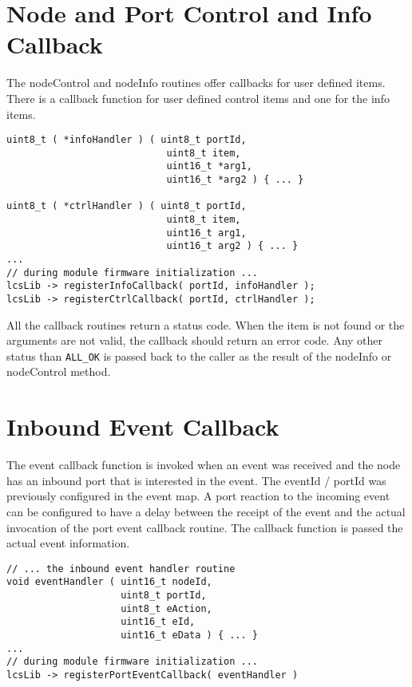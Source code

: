 \section{Node and Port Control and Info Callback}

The nodeControl and nodeInfo routines offer callbacks for user defined items. There is a callback function for user defined control items and one for the info items.

\lstset{style=codesnippetstyle}
\begin{lstlisting}
uint8_t ( *infoHandler ) ( uint8_t portId, 
                            uint8_t item, 
                            uint16_t *arg1, 
                            uint16_t *arg2 ) { ... }

uint8_t ( *ctrlHandler ) ( uint8_t portId, 
                            uint8_t item, 
                            uint16_t arg1, 
                            uint16_t arg2 ) { ... }
...
// during module firmware initialization ...
lcsLib -> registerInfoCallback( portId, infoHandler );
lcsLib -> registerCtrlCallback( portId, ctrlHandler );
\end{lstlisting}

All the callback routines return a status code. When the item is not found or the arguments are not valid, the callback should return an error code. Any other status than \texttt{ALL\_OK} is passed back to the caller as the result of the nodeInfo or nodeControl method.

\section{Inbound Event Callback}

The event callback function is invoked when an event was received and the node has an inbound port that is interested in the event. The eventId / portId was previously configured in the event map. A port reaction to the incoming event can be configured to have a delay between the receipt of the event and the actual invocation of the port event callback routine. The callback function is passed the actual event information.

\lstset{style=codesnippetstyle}
\begin{lstlisting}
// ... the inbound event handler routine
void eventHandler ( uint16_t nodeId, 
                    uint8_t portId, 
                    uint8_t eAction,
                    uint16_t eId, 
                    uint16_t eData ) { ... }
...
// during module firmware initialization ...
lcsLib -> registerPortEventCallback( eventHandler )
\end{lstlisting}

